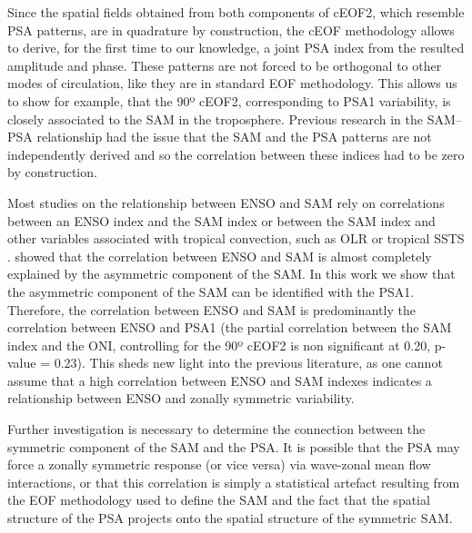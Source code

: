 \documentclass[pdflatex,sn-basic]{sn-jnl}
\theoremstyle{thmstyleone}%
\theoremstyle{thmstyletwo}%
\theoremstyle{thmstylethree}%
\begin{document}
Since the spatial fields obtained from both components of cEOF2, which resemble PSA patterns, are in quadrature by construction, the cEOF methodology allows to derive, for the first time to our knowledge, a joint PSA index from the resulted amplitude and phase.
These patterns are not forced to be orthogonal to other modes of circulation, like they are in standard EOF methodology.
This allows us to show for example, that the 90º cEOF2, corresponding to PSA1 variability, is closely associated to the SAM in the troposphere.
Previous research in the SAM--PSA relationship had the issue that the SAM and the PSA patterns are not independently derived and so the correlation between these indices had to be zero by construction.

Most studies on the relationship between ENSO and SAM rely on correlations between an ENSO index and the SAM index \citep[e.g.][\citet{cai2011a}]{lheureux2006} or between the SAM index and other variables associated with tropical convection, such as OLR or tropical SSTS \citep[e.g.][]{carvalho2005}.
\citet{campitelli2022} showed that the correlation between ENSO and SAM is almost completely explained by the asymmetric component of the SAM.
In this work we show that the asymmetric component of the SAM can be identified with the PSA1.
Therefore, the correlation between ENSO and SAM is predominantly the correlation between ENSO and PSA1 (the partial correlation between the SAM index and the ONI, controlling for the 90º cEOF2 is non significant at 0.20, p-value = 0.23).
This sheds new light into the previous literature, as one cannot assume that a high correlation between ENSO and SAM indexes indicates a relationship between ENSO and zonally symmetric variability.

Further investigation is necessary to determine the connection between the symmetric component of the SAM and the PSA.
It is possible that the PSA may force a zonally symmetric response (or vice versa) via wave-zonal mean flow interactions, or that this correlation is simply a statistical artefact resulting from the EOF methodology used to define the SAM and the fact that the spatial structure of the PSA projects onto the spatial structure of the symmetric SAM.
\end{document}
